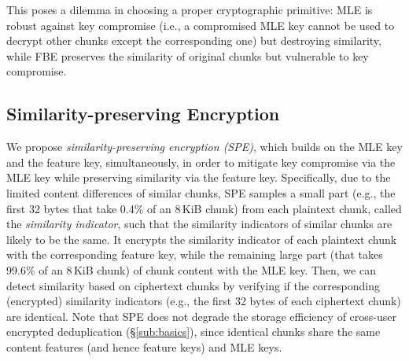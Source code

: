 


This poses a dilemma in choosing a proper cryptographic primitive: MLE is robust against key compromise (i.e., a compromised MLE key cannot  be used to decrypt other chunks except the corresponding one) but destroying similarity, while FBE preserves the similarity of original chunks but vulnerable to key compromise.



\subsection{Similarity-preserving Encryption}
\label{sub:spe}


We propose {\em similarity-preserving encryption (SPE)}, which builds on the MLE key and the feature key, simultaneously, in order to mitigate key compromise via the MLE key while preserving similarity via the feature key.
Specifically, due to the limited content differences of similar chunks, SPE samples a small part (e.g., the first 32 bytes that take 0.4\% of an 8\,KiB chunk) from each plaintext chunk, called the {\em similarity indicator}, such that the similarity indicators of similar chunks are likely to be the same. It encrypts the similarity indicator of each plaintext chunk with the corresponding feature key, while the remaining large part (that takes 99.6\% of an 8\,KiB chunk) of chunk content with the MLE key. Then, we can  detect similarity based on ciphertext chunks by verifying if the corresponding (encrypted) similarity indicators (e.g., the first 32 bytes of each ciphertext chunk) are identical.
Note that SPE does not degrade the storage efficiency of cross-user encrypted deduplication (\S\ref{sub:basics}), since identical chunks share the same content features (and hence feature keys) and MLE keys.

